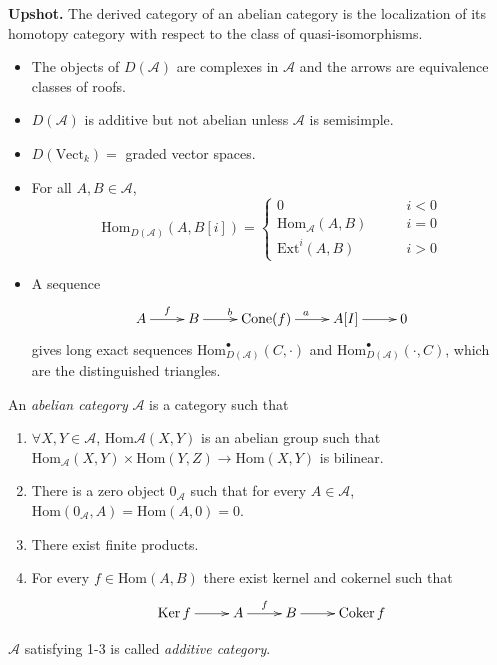 {\bf Upshot.} The derived category of an abelian category is the localization of
its homotopy category with respect to the class of quasi-isomorphisms.
\begin{itemize}
\item The objects of $D(\mathcal{A})$ are complexes in $\mathcal{A}$ and the
arrows are equivalence classes of roofs.
\item $D(\mathcal{A})$ is additive but not abelian unless $\mathcal{A}$ is
semisimple.
\item $D(\text{Vect}_k)=$ graded vector spaces.
\item For all $A,B\in \mathcal{A}$,
$$
\text{Hom}_{D(\mathcal{A})}(A,B[i])=
\begin{cases}
0\qquad &i<0 \\
\text{Hom}_{\mathcal{A}}(A,B)\qquad &i=0\\
\text{Ext}^i(A,B)\qquad &i>0
\end{cases}
$$
\item A sequence
$$
\xymatrix{
A\ar[r]^f&B\ar[r]^b&\text{Cone}(f)\ar[r]^a&A[I]\ar[r]&0
}
$$
gives long exact sequences $\text{Hom}^\bullet_{D(\mathcal{A})}(C,\cdot)$ and 
$\text{Hom}^\bullet_{D(\mathcal{A})}(\cdot,C)$, which are the distinguished
triangles.
\end{itemize}
\medskip
\begin{definition}
\label{definition-abelian-category}
An {\it abelian category} $\mathcal{A}$ is a category such that
\begin{enumerate}
\item $\forall X,Y \in \mathcal{A}$, $\text{Hom}{\mathcal{A}}(X,Y)$ is an
abelian group such that $\text{Hom}_{\mathcal{A}}(X,Y)\times\text{Hom}(Y,Z)\to
\text{Hom}(X,Y)$ is bilinear.
\item There is a zero object $0_{\mathcal{A}}$ such that for every $A \in
\mathcal{A}$, $\text{Hom}(0_{\mathcal{A}},A)=\text{Hom}(A,0)=0$.
\item There exist finite products.
\item For every  $f \in \text{Hom}(A,B)$ there exist kernel and cokernel such
that
$$
\xymatrix{
\Ker f\ar[r]&A\ar[r]^{f}&B\ar[r]&\Coker f
}
$$
\end{enumerate}
\end{definition}

\begin{definition}
\label{definition-additive-category}
$\mathcal{A}$ satisfying 1-3 is called  {\it additive category}.
\end{definition}

